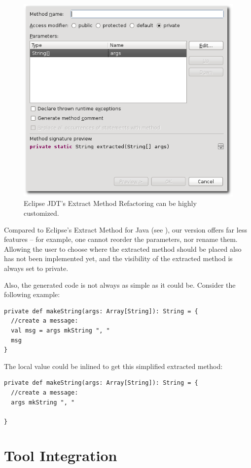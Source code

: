 \documentclass[10pt,a4paper,oneside]{scrreprt}
\begin{document}
\begin{figure}
  \centering
  \includegraphics[width=0.6\linewidth]{extract_method_java_screenshot_1.png}
  \caption{Eclipse JDT's Extract Method Refactoring can be highly customized.}
  \label{figure:extract-method-java-screenshot-1}
\end{figure}


Compared to Eclipse's Extract Method for Java (see ), our version offers far less features -- for example, one cannot reorder the parameters, nor rename them. Allowing the user to choose where the extracted method should be placed also has not been implemented yet, and the visibility of the extracted method is always set to private.

Also, the generated code is not always as simple as it could be. Consider the following example:

\begin{lstlisting}
private def makeString(args: Array[String]): String = {
  //create a message:
  val msg = args mkString ", "
  msg
}
\end{lstlisting}

The local value  could be inlined to get this simplified extracted method:

\begin{lstlisting}
private def makeString(args: Array[String]): String = {
  //create a message:
  args mkString ", "

}
\end{lstlisting}

\chapter{Tool Integration} \label{chapter:tool-integration}
\end{document}
